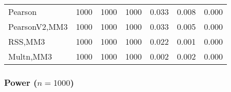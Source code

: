 \documentclass[
]{article}
\begin{document}
\begin{table}[H]
{\begin{tabular}[t]{lrrrrrr}
\hspace{1em}Pearson & 1000 & 1000 & 1000 & 0.033 & 0.008 & 0.000\\
\hspace{1em}PearsonV2,MM3 & 1000 & 1000 & 1000 & 0.033 & 0.005 & 0.000\\
\hspace{1em}RSS,MM3 & 1000 & 1000 & 1000 & 0.022 & 0.001 & 0.000\\
\hspace{1em}Multn,MM3 & 1000 & 1000 & 1000 & 0.002 & 0.002 & 0.000\\
\bottomrule
\end{tabular}}
\end{table}

\hypertarget{power-n1000-2}{%
\subsubsection{\texorpdfstring{Power
(\(n=1000\))}{Power (n=1000)}}\label{power-n1000-2}}
\end{document}
